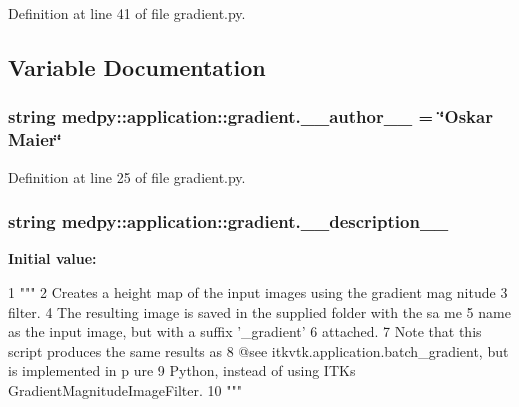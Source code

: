 Definition at line 41 of file gradient.py.



\subsection{Variable Documentation}
\hypertarget{namespacemedpy_1_1application_1_1gradient_aa1d6344cd5a395d7e4d587483d436166}{
\subsubsection[{\_\-\_\-author\_\-\_\-}]{\setlength{\rightskip}{0pt plus 5cm}string {\bf medpy::application::gradient.\_\-\_\-author\_\-\_\-} = \char`\"{}Oskar Maier\char`\"{}}}
\label{namespacemedpy_1_1application_1_1gradient_aa1d6344cd5a395d7e4d587483d436166}


Definition at line 25 of file gradient.py.

\hypertarget{namespacemedpy_1_1application_1_1gradient_a51b8dae829491ed7c627731fbff856a5}{
\subsubsection[{\_\-\_\-description\_\-\_\-}]{\setlength{\rightskip}{0pt plus 5cm}string {\bf medpy::application::gradient.\_\-\_\-description\_\-\_\-}}}
\label{namespacemedpy_1_1application_1_1gradient_a51b8dae829491ed7c627731fbff856a5}
{\bfseries Initial value:}
\begin{DoxyCode}
1 """
2                   Creates a height map of the input images using the gradient mag
      nitude
3                   filter.
4                   The resulting image is saved in the supplied folder with the sa
      me
5                   name as the input image, but with a suffix '_gradient'
6                   attached.
7                   Note that this script produces the same results as
8                   @see itkvtk.application.batch_gradient, but is implemented in p
      ure
9                   Python, instead of using ITKs GradientMagnitudeImageFilter. 
10                   """
\end{DoxyCode}


